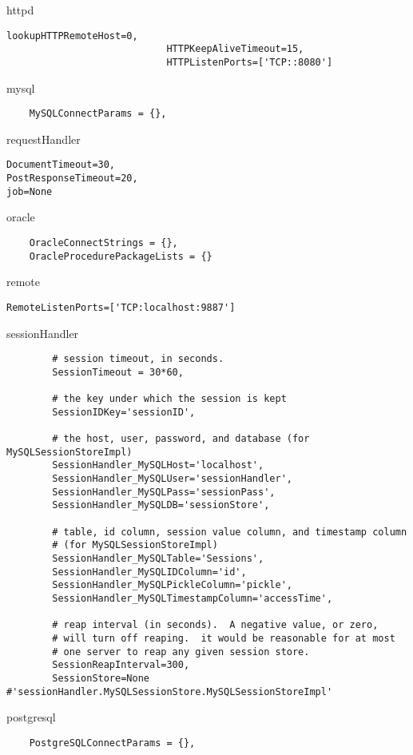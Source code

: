 \documentclass[titlepage]{manual}
\begin{document}
httpd
\begin{verbatim}
lookupHTTPRemoteHost=0,
                            HTTPKeepAliveTimeout=15,
                            HTTPListenPorts=['TCP::8080']
\end{verbatim}

mysql
\begin{verbatim}
    MySQLConnectParams = {},
\end{verbatim}


requestHandler
\begin{verbatim}
DocumentTimeout=30,
PostResponseTimeout=20,
job=None
\end{verbatim}

oracle
\begin{verbatim}
    OracleConnectStrings = {},
    OracleProcedurePackageLists = {}
\end{verbatim}


remote
\begin{verbatim}
RemoteListenPorts=['TCP:localhost:9887']
\end{verbatim}


sessionHandler
\begin{verbatim}
        # session timeout, in seconds. 
        SessionTimeout = 30*60,
        
        # the key under which the session is kept
        SessionIDKey='sessionID',
        
        # the host, user, password, and database (for MySQLSessionStoreImpl)
        SessionHandler_MySQLHost='localhost',
        SessionHandler_MySQLUser='sessionHandler',
        SessionHandler_MySQLPass='sessionPass',
        SessionHandler_MySQLDB='sessionStore',
        
        # table, id column, session value column, and timestamp column
        # (for MySQLSessionStoreImpl)
        SessionHandler_MySQLTable='Sessions',
        SessionHandler_MySQLIDColumn='id',
        SessionHandler_MySQLPickleColumn='pickle',
        SessionHandler_MySQLTimestampColumn='accessTime',
        
        # reap interval (in seconds).  A negative value, or zero,
        # will turn off reaping.  it would be reasonable for at most
        # one server to reap any given session store.
        SessionReapInterval=300,
        SessionStore=None    #'sessionHandler.MySQLSessionStore.MySQLSessionStoreImpl'
\end{verbatim}


postgresql
\begin{verbatim}
    PostgreSQLConnectParams = {},
\end{verbatim}
\end{document}
